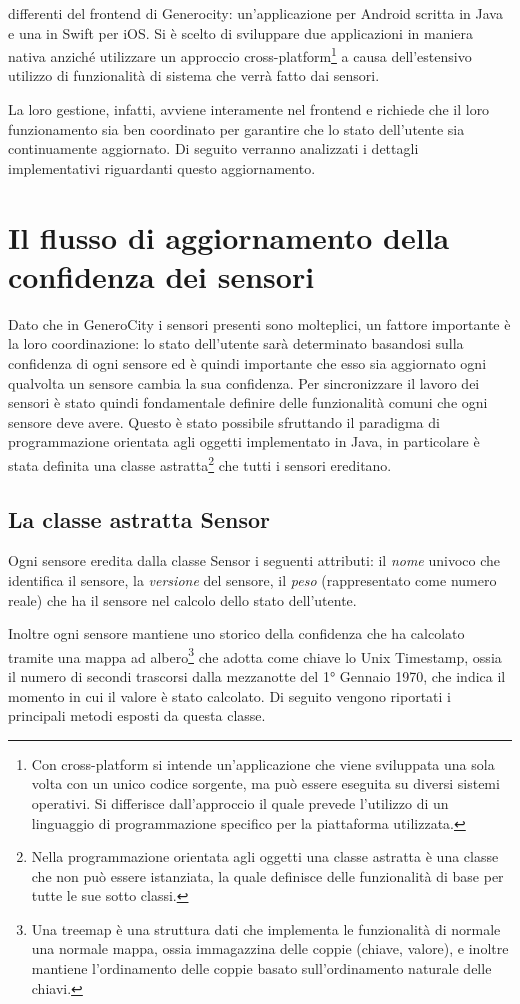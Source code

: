 differenti del frontend di Generocity: un'applicazione per Android scritta in Java e una in Swift per iOS. Si è scelto di sviluppare due applicazioni in maniera nativa anziché utilizzare un approccio cross-platform\footnote{Con cross-platform si intende un'applicazione che viene sviluppata una sola volta con un unico codice sorgente, ma può essere eseguita su diversi sistemi operativi. Si differisce dall'approccio il quale prevede l'utilizzo di un linguaggio di programmazione specifico per la piattaforma utilizzata.} a causa dell'estensivo utilizzo di funzionalità di sistema che verrà fatto dai sensori.

La loro gestione, infatti,  avviene interamente nel frontend e richiede che il loro funzionamento sia ben coordinato per garantire che lo stato dell'utente sia continuamente aggiornato. Di seguito verranno analizzati i dettagli implementativi riguardanti questo aggiornamento.


\section{Il flusso di aggiornamento della confidenza dei sensori}
Dato che in GeneroCity i sensori presenti sono molteplici, un fattore importante è la loro coordinazione: lo stato dell'utente sarà determinato basandosi sulla confidenza di ogni sensore ed è quindi importante che esso sia aggiornato ogni qualvolta un sensore cambia la sua confidenza. Per sincronizzare il lavoro dei sensori è stato quindi fondamentale definire delle funzionalità comuni che ogni sensore deve avere. Questo è stato possibile sfruttando il paradigma di programmazione orientata agli oggetti implementato in Java, in particolare è stata definita una classe astratta\footnote{Nella programmazione orientata agli oggetti una classe astratta è una classe che non può essere istanziata, la quale definisce delle funzionalità di base per tutte le sue sotto classi.} che tutti i sensori ereditano.

\subsection{La classe astratta Sensor}
Ogni sensore eredita dalla classe Sensor i seguenti attributi: il \textit{nome} univoco che identifica il sensore, la \textit{versione} del sensore, il \textit{peso} (rappresentato come numero reale) che ha il sensore nel calcolo dello stato dell'utente.

Inoltre ogni sensore mantiene uno storico della confidenza che ha calcolato tramite una mappa ad albero\footnote{Una treemap è una struttura dati che implementa le funzionalità di normale una normale mappa, ossia immagazzina delle coppie (chiave, valore), e inoltre mantiene l'ordinamento delle coppie basato sull'ordinamento naturale delle chiavi.} che adotta come chiave lo Unix Timestamp, ossia il numero di secondi trascorsi dalla mezzanotte del 1° Gennaio 1970, che indica il momento in cui il valore è stato calcolato. Di seguito vengono riportati i principali metodi esposti da questa classe.
